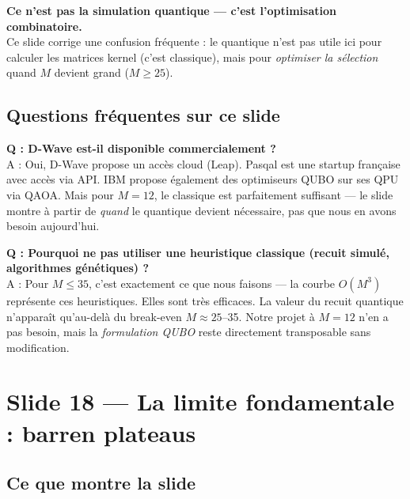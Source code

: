 \documentclass[12pt, a4paper]{article}
\begin{document}
\begin{retenir}
\textbf{Ce n'est pas la simulation quantique — c'est l'optimisation combinatoire.}\\
Ce slide corrige une confusion fréquente : le quantique n'est pas utile ici pour
calculer les matrices kernel (c'est classique), mais pour \emph{optimiser la sélection}
quand $M$ devient grand ($M \geq 25$).
\end{retenir}

\subsection*{Questions fréquentes sur ce slide}

\begin{question}
\textbf{Q : D-Wave est-il disponible commercialement ?}\\
A : Oui, D-Wave propose un accès cloud (Leap). Pasqal est une startup française avec
accès via API. IBM propose également des optimiseurs QUBO sur ses QPU via QAOA.
Mais pour $M=12$, le classique est parfaitement suffisant — le slide montre à partir
de \emph{quand} le quantique devient nécessaire, pas que nous en avons besoin aujourd'hui.
\end{question}

\begin{question}
\textbf{Q : Pourquoi ne pas utiliser une heuristique classique (recuit simulé, algorithmes génétiques) ?}\\
A : Pour $M \leq 35$, c'est exactement ce que nous faisons — la courbe $O(M^3)$ représente
ces heuristiques. Elles sont très efficaces. La valeur du recuit quantique n'apparaît qu'au-delà
du break-even $M \approx 25$--35. Notre projet à $M=12$ n'en a pas besoin, mais la
\emph{formulation QUBO} reste directement transposable sans modification.
\end{question}

\section{Slide 18 — La limite fondamentale : barren plateaus}

\subsection*{Ce que montre la slide}
\end{document}
